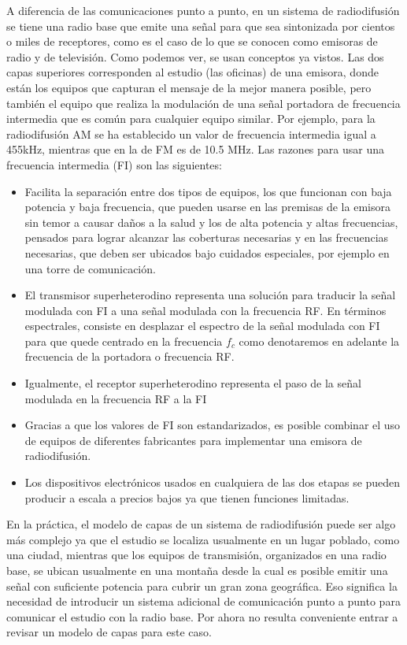 A diferencia de las comunicaciones punto a punto, en un sistema de radiodifusión se tiene una radio base que emite una señal para que sea sintonizada por cientos o miles de receptores, como es el caso de lo que se conocen como emisoras de radio y de televisión. Como podemos ver, se usan conceptos ya vistos. Las dos capas superiores corresponden al estudio (las oficinas) de una emisora, donde están los equipos que capturan el mensaje de la mejor manera posible, pero también el equipo que realiza la modulación de una señal portadora de frecuencia intermedia que es común para cualquier equipo similar. Por ejemplo, para la radiodifusión AM se ha establecido un valor de frecuencia intermedia igual a 455kHz, mientras que en la de FM es de 10.5 MHz. Las razones para usar una frecuencia intermedia (FI) son las siguientes: \\

\begin{itemize}
	\item  Facilita la separación entre dos tipos de equipos, los que funcionan con baja potencia y baja frecuencia, que pueden usarse en las premisas de la emisora sin temor a causar daños a la salud y los de alta potencia y altas frecuencias, pensados para lograr alcanzar las coberturas necesarias y en las frecuencias necesarias, que deben ser ubicados bajo cuidados especiales, por ejemplo en una torre de comunicación.
    \item  El transmisor superheterodino representa una solución para traducir la señal modulada con FI a una señal modulada con la frecuencia RF. En términos espectrales, consiste en desplazar el espectro de la señal modulada con FI para que quede centrado en la frecuencia $f_c$ como denotaremos en adelante la frecuencia de la portadora o frecuencia RF.
    \item  Igualmente, el receptor superheterodino representa el paso de la señal modulada en la frecuencia RF a la FI
	\item  Gracias a que los valores de FI son estandarizados, es posible combinar el uso de  equipos de diferentes fabricantes para implementar una emisora de radiodifusión.
    \item  Los dispositivos electrónicos usados en cualquiera de las dos etapas se pueden producir a escala a precios bajos ya que tienen funciones limitadas.
\end{itemize}

En la práctica, el modelo de capas de un sistema de radiodifusión puede ser algo más complejo ya que el estudio se localiza usualmente en un lugar poblado, como una ciudad, mientras que los equipos de transmisión, organizados en una radio base, se ubican usualmente en una montaña desde la cual es posible emitir una señal con suficiente potencia para cubrir un gran zona geográfica. Eso significa la necesidad de introducir un sistema adicional de comunicación punto a punto para comunicar el estudio con la radio base. Por ahora no resulta conveniente entrar a revisar un modelo de capas para este caso.\\




